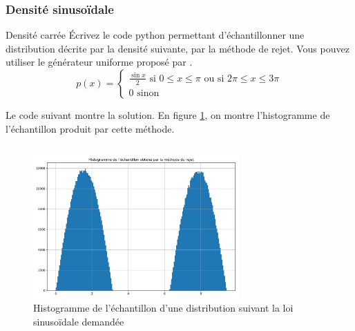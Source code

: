             \subsubsection{Densité sinusoïdale}
                \begin{exercise}{Densité carrée}
                    Écrivez le code python permettant d'échantillonner une distribution décrite par la densité suivante, par la méthode de rejet. Vous pouvez utiliser le générateur uniforme proposé par .
                    \begin{equation}
                        p(x) = 
                        \begin{cases}
                            \frac{\sin x}{2} \text{ si $0\leq x\leq \pi$ ou si  $2\pi\leq x\leq 3\pi$}\\
                            0 \text{ sinon}
                        \end{cases}
                    \end{equation}
                \end{exercise}
                Le code suivant montre la solution. En figure \ref{fig:exercice_rejet_2}, on montre l'histogramme de l'échantillon produit par cette méthode.
                \inputminted{python}{codes/exercice_rejet_2.py}
                \begin{figure}[ht!]
                    \centering
                    \includegraphics[width=0.7\textwidth]{images/exercice_rejet_2.jpg}
                    \caption{Histogramme de l'échantillon d'une distribution suivant la loi sinusoïdale demandée}
                    \label{fig:exercice_rejet_2}
                \end{figure}

